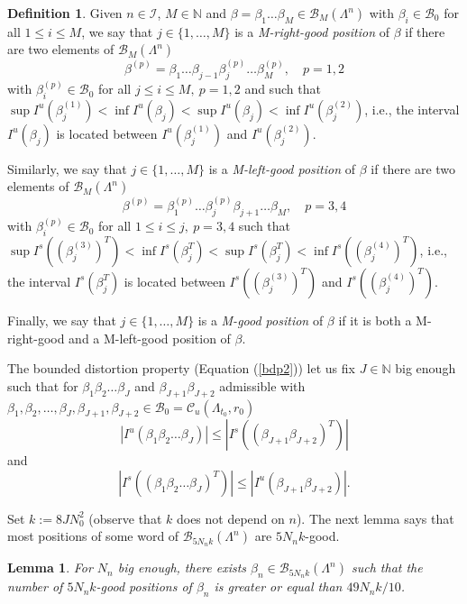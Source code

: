 \documentclass[12pt]{amsart}
\theoremstyle{plain} %
\newtheorem{lemma}[theorem]{Lemma}
\theoremstyle{definition} %
\newtheorem{definition}[theorem]{Definition}
\numberwithin{equation}{section}
\begin{document}
\begin{definition}\label{good-position} Given $n\in \mathcal{I}$, $ M\in \mathbb{N}$ and $\beta=\beta_1\dots\beta_M \in \mathcal{B}_M(\Lambda^n) $ with $\beta_i\in\mathcal{B}_0$ for all $1\leq i\leq M$, we say that $j\in\{1,\dots,M\}$ is a \emph{M-right-good position} of $\beta$ if there are two elements of $\mathcal{B}_M(\Lambda^n)$
$$\beta^{(p)}=\beta_1\dots\beta_{j-1}\beta_j^{(p)}\dots\beta_M^{(p)}, \quad p=1, 2$$
with  $\beta_i^{(p)}\in\mathcal{B}_0$ for all $j\leq i\leq M, \ p=1, 2$ and  such that $\sup I^u(\beta_j^{(1)})<\inf I^u(\beta_j)< \sup I^u(\beta_j)<\inf I^u(\beta_j^{(2)})$, i.e., the interval $I^u(\beta_j)$ is located between $I^u(\beta_j^{(1)})$ and $I^u(\beta_j^{(2)})$. 

Similarly, we say that $j\in\{1,\dots, M\}$ is a \emph{M-left-good position} of $\beta$ if there are two elements of $\mathcal{B}_M(\Lambda^n)$
$$\beta^{(p)}=\beta_1^{(p)}\dots\beta_j^{(p)}\beta_{j+1}\dots\beta_M, \quad p=3, 4$$
with  $\beta_i^{(p)}\in\mathcal{B}_0$ for all $1\leq i\leq j, \ p=3, 4$ such that $\sup I^s((\beta_j^{(3)})^T)<\inf I^s(\beta_j^T)< \sup I^s(\beta_j^T)<\inf I^s((\beta_j^{(4)})^T)$, i.e., the interval $I^s(\beta_j^T)$ is located between $I^s((\beta_j^{(3)})^T)$ and $I^s((\beta_j^{(4)})^T)$.

Finally, we say that $j\in\{1,\dots, M\}$ is a \emph{M-good position} of $\beta$ if it is both a M-right-good and a M-left-good position of $\beta$.
\end{definition}
The bounded distortion property (Equation (\ref{bdp2})) let us fix $J\in \mathbb{N}$ big enough such that for $\beta_1\beta_2\dots\beta_J$ and $\beta_{J+1}\beta_{J+2}$ admissible with $\beta_1,\beta_2,\dots,\beta_J,\beta_{J+1},\beta_{J+2} \in\mathcal{B}_0=\mathcal{C}_u(\Lambda_{t_0},r_0)$ 
$$|I^u(\beta_1\beta_2\dots\beta_J)|\leq |I^s((\beta_{J+1}\beta_{J+2})^T)|$$
and 
$$|I^s((\beta_1\beta_2\dots\beta_J)^T)|\leq |I^u(\beta_{J+1}\beta_{J+2})|.$$


Set $k:=8J N_0^2$ (observe that $k$ does not depend on $n$). The next lemma says that most positions of some word of $\mathcal{B}_{5N_n k}(\Lambda^{n})$ are $5N_n k$-good.

\begin{lemma}\label{good} For $N_n$ big enough, there exists $\beta_n \in \mathcal{B}_{5N_n k}(\Lambda^{n})$ such that the number of  $5N_n k$-good positions of  $\beta_n$ is greater or equal than $49N_n k/10$.

\end{lemma}
\end{document}
